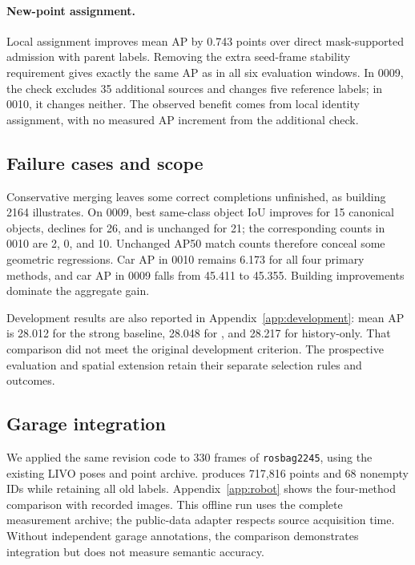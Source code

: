 \paragraph{New-point assignment.}
Local assignment improves mean AP by 0.743 points over direct mask-supported admission with parent labels. Removing the extra seed-frame stability requirement gives exactly the same AP as \ours{} in all six evaluation windows. In 0009, the check excludes 35 additional sources and changes five reference labels; in 0010, it changes neither. The observed benefit comes from local identity assignment, with no measured AP increment from the additional check.

\subsection{Failure cases and scope}
Conservative merging leaves some correct completions unfinished, as building 2164 illustrates. On 0009, best same-class object IoU improves for 15 canonical objects, declines for 26, and is unchanged for 21; the corresponding counts in 0010 are 2, 0, and 10. Unchanged AP50 match counts therefore conceal some geometric regressions. Car AP in 0010 remains 6.173 for all four primary methods, and car AP in 0009 falls from 45.411 to 45.355. Building improvements dominate the aggregate gain.

Development results are also reported in Appendix~\ref{app:development}: mean AP is 28.012 for the strong baseline, 28.048 for \ours{}, and 28.217 for history-only. That comparison did not meet the original development criterion. The prospective evaluation and spatial extension retain their separate selection rules and outcomes.

\subsection{Garage integration}
We applied the same revision code to 330 frames of \texttt{rosbag2245}, using the existing LIVO poses and point archive. \ours{} produces 717,816 points and 68 nonempty IDs while retaining all old labels. Appendix~\ref{app:robot} shows the four-method comparison with recorded images. This offline run uses the complete measurement archive; the public-data adapter respects source acquisition time. Without independent garage annotations, the comparison demonstrates integration but does not measure semantic accuracy.

